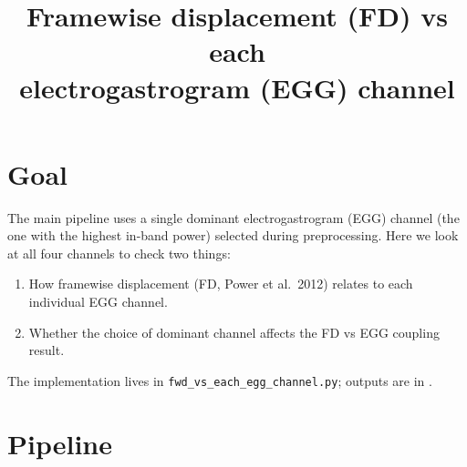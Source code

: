 \documentclass[11pt]{article}
\title{\bfseries Framewise displacement (FD) vs each\\
electrogastrogram (EGG) channel}
\author{}
\date{}
\begin{document}
\maketitle

\section{Goal}

The main pipeline uses a single dominant electrogastrogram (EGG) channel
(the one with the highest in-band power) selected during preprocessing.
Here we look at all four channels to check two things:

\begin{enumerate}
\item How framewise displacement (FD, Power et al.\ 2012) relates to
each individual EGG channel.
\item Whether the choice of dominant channel affects the FD vs EGG
coupling result.
\end{enumerate}

The implementation lives in \texttt{fwd\_vs\_each\_egg\_channel.py};
outputs are in .

\section{Pipeline}
\end{document}

